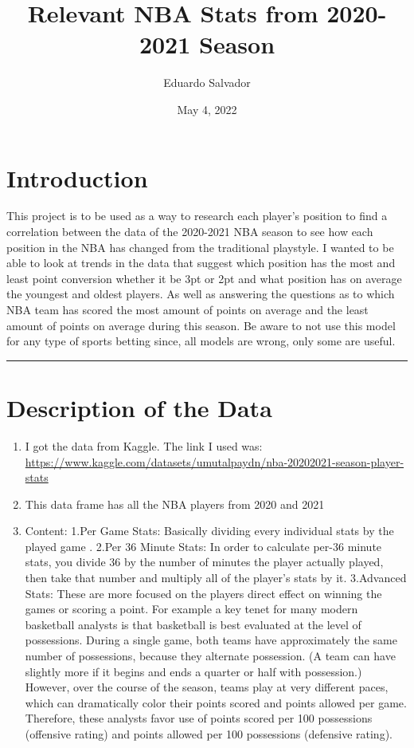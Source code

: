 \documentclass[
]{article}
\title{Relevant NBA Stats from 2020-2021 Season}
\author{Eduardo Salvador}
\date{May 4, 2022}
\providecommand{\tightlist}{%
  \setlength{\itemsep}{0pt}\setlength{\parskip}{0pt}}
\begin{document}
\maketitle

\clearpage

\hypertarget{introduction}{%
\section{Introduction}\label{introduction}}

This project is to be used as a way to research each player's position
to find a correlation between the data of the 2020-2021 NBA season to
see how each position in the NBA has changed from the traditional
playstyle. I wanted to be able to look at trends in the data that
suggest which position has the most and least point conversion whether
it be 3pt or 2pt and what position has on average the youngest and
oldest players. As well as answering the questions as to which NBA team
has scored the most amount of points on average and the least amount of
points on average during this season. Be aware to not use this model for
any type of sports betting since, all models are wrong, only some are
useful.

\vspace{.2in}
\hrule
\vspace{.2in}

\hypertarget{description-of-the-data}{%
\section{Description of the Data}\label{description-of-the-data}}

\begin{enumerate}
\def\labelenumi{\arabic{enumi}.}
\tightlist
\item
  I got the data from Kaggle. The link I used was:
  \url{https://www.kaggle.com/datasets/umutalpaydn/nba-20202021-season-player-stats}
\item
  This data frame has all the NBA players from 2020 and 2021
\item
  Content: 1.Per Game Stats: Basically dividing every individual stats
  by the played game . 2.Per 36 Minute Stats: In order to calculate
  per-36 minute stats, you divide 36 by the number of minutes the player
  actually played, then take that number and multiply all of the
  player's stats by it. 3.Advanced Stats: These are more focused on the
  players direct effect on winning the games or scoring a point. For
  example a key tenet for many modern basketball analysts is that
  basketball is best evaluated at the level of possessions. During a
  single game, both teams have approximately the same number of
  possessions, because they alternate possession. (A team can have
  slightly more if it begins and ends a quarter or half with
  possession.) However, over the course of the season, teams play at
  very different paces, which can dramatically color their points scored
  and points allowed per game. Therefore, these analysts favor use of
  points scored per 100 possessions (offensive rating) and points
  allowed per 100 possessions (defensive rating).
\end{enumerate}
\end{document}
